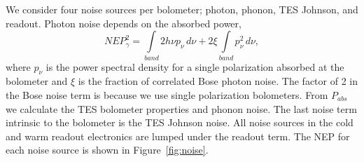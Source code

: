 \documentclass[]{spie}  %
\newcommand{\comr}[1]{\textcolor{red}{#1}}
\begin{document}

We consider four noise sources per bolometer; photon, phonon, TES Johnson, and readout. 
Photon noise depends on the absorbed power\cite{richards1994}, 
\begin{equation}
\label{eq:photon}
NEP_{\gamma}^2 = \int\limits_{band} 2h\nu p_{\nu} \, d\nu + 2\xi \int\limits_{band} p_{\nu}^2 \,  d\nu,
\end{equation} 
where $p_{\nu}$ is the power spectral density for a single polarization absorbed at the bolometer and $\xi$ is the fraction of correlated Bose 
photon noise. The factor of 2 in the Bose noise term is because we use single polarization bolometers.  
%
%
From $P_{abs}$ we calculate the TES bolometer properties and phonon noise.\cite{mather1982}  
The last noise term intrinsic to the bolometer is the TES Johnson noise. All noise sources in the cold and warm readout 
electronics are lumped under the readout term.  The NEP for each noise source is shown in Figure~\ref{fig:noise}.


\end{document}
